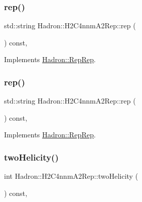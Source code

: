 \subsubsection{\texorpdfstring{rep()}{rep()}\hspace{0.1cm}{\footnotesize\ttfamily [4/5]}}
{\footnotesize\ttfamily std\+::string Hadron\+::\+H2\+C4nnm\+A2\+Rep\+::rep (\begin{DoxyParamCaption}{ }\end{DoxyParamCaption}) const\hspace{0.3cm}{\ttfamily [inline]}, {\ttfamily [virtual]}}



Implements \mbox{\hyperlink{structHadron_1_1RepRep_ab3213025f6de249f7095892109575fde}{Hadron\+::\+Rep\+Rep}}.

\mbox{\label{structHadron_1_1H2C4nnmA2Rep_ab3b885d6ae0238dfffab82f55bbf4a2d}} 
\subsubsection{\texorpdfstring{rep()}{rep()}\hspace{0.1cm}{\footnotesize\ttfamily [5/5]}}
{\footnotesize\ttfamily std\+::string Hadron\+::\+H2\+C4nnm\+A2\+Rep\+::rep (\begin{DoxyParamCaption}{ }\end{DoxyParamCaption}) const\hspace{0.3cm}{\ttfamily [inline]}, {\ttfamily [virtual]}}



Implements \mbox{\hyperlink{structHadron_1_1RepRep_ab3213025f6de249f7095892109575fde}{Hadron\+::\+Rep\+Rep}}.

\mbox{\label{structHadron_1_1H2C4nnmA2Rep_ad9e40b53e19e1adae3441a6a6320d3b1}} 
\subsubsection{\texorpdfstring{twoHelicity()}{twoHelicity()}\hspace{0.1cm}{\footnotesize\ttfamily [1/3]}}
{\footnotesize\ttfamily int Hadron\+::\+H2\+C4nnm\+A2\+Rep\+::two\+Helicity (\begin{DoxyParamCaption}{ }\end{DoxyParamCaption}) const\hspace{0.3cm}{\ttfamily [inline]}, {\ttfamily [virtual]}}

